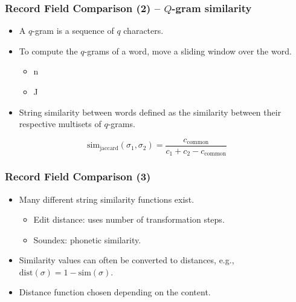 \documentclass[12pt]{beamer}
\theoremstyle{break}
\begin{document}
\begin{frame}
	\frametitle{Record Field Comparison (2) -- $Q$-gram similarity}
	
	\begin{itemize}
		\item A $q$-gram is a sequence of $q$ characters.
		\item To compute the $q$-grams of a word, move a sliding window over the word.\begin{itemize}
				\item {}n
				\item J
			\end{itemize}
		\item String similarity between words defined as the similarity between their respective multisets of $q$-grams.
	\end{itemize}
	
	\pause
	
	\begin{equation*}
		\textrm{sim}_{\textrm{jaccard}}(\sigma_1, \sigma_2) = \frac{c_{\textrm{common}}}{c_1 + c_2 - c_{\textrm{common}}}
	\end{equation*}

\end{frame}




\begin{frame}
	\frametitle{Record Field Comparison (3)}
	
	\begin{itemize}
		\item Many different string similarity functions exist. \begin{itemize}
			\item Edit distance: uses number of transformation steps.
			\item Soundex: phonetic similarity.
		\end{itemize}
		\item Similarity values can often be converted to distances, e.g., $\mathrm{dist}(\sigma)=1-\mathrm{sim}(\sigma)$.
		\item Distance function chosen depending on the content.
	\end{itemize}
	
\end{frame}


\end{document}
